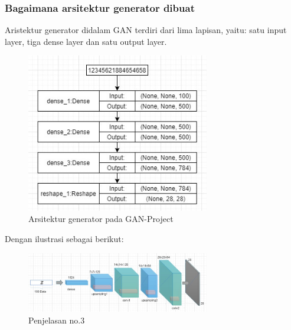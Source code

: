 \subsubsection{Bagaimana arsitektur generator dibuat}
\hfill\break
Aristektur generator didalam GAN terdiri dari lima lapisan, yaitu: satu input layer, tiga dense layer dan satu output layer.
\begin{figure}[H]
	\centering
	\includegraphics[width=8cm]{figures/1174066/8/3a.jpg}
	\caption{Arsitektur generator pada GAN-Project}
\end{figure}
Dengan ilustrasi sebagai berikut:
\begin{figure}[H]
	\centering
	\includegraphics[width=8cm]{figures/1174066/8/3.jpg}
	\caption{Penjelasan no.3}
\end{figure}

